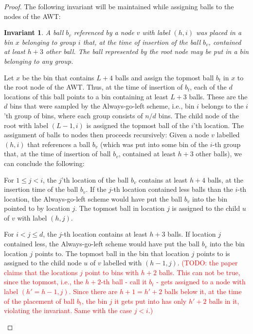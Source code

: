 \documentclass[a4paper,12pt]{article}
\newcommand\todo[1]{\textcolor{red}{(TODO: #1)}}
\newtheorem{invariant}{Invariant}
\begin{document}
\begin{proof}
The following invariant will be maintained while assigning balls to the nodes of the AWT:
\begin{invariant}
A ball $b_v$ referenced by a node $v$ with label $(h,i)$ was placed in a bin $x$ belonging to group $i$ that, at the time of insertion of the ball $b_v$, contained at least $h+3$ other ball. The ball represented by the root node may be put in a bin belonging to any group.
\end{invariant}
\noindent
Let $x$ be the bin that contains $L+4$ balls and assign the topmost ball $b_t$ in $x$ to the root node of the AWT. Thus, at the time of insertion of $b_t$, each of the $d$ locations of this ball points to a bin containing at least $L+3$ balls. These are the $d$ bins that were sampled by the Always-go-left scheme, i.e., bin $i$ belongs to the $i$'th group of bins, where each group consists of $n/d$ bins. The child node of the root with label $(L-1, i)$ is assigned the topmost ball of the $i$'th location. The assignment of balls to nodes then proceeds recursively: Given a node $v$ labelled $(h, i)$ that references a ball $b_v$ (which was put into some bin of the $i$-th group that, at the time of insertion of ball $b_v$, contained at least $h+3$ other balls), we can conclude the following:
\begin{compactitem}
\item For $1\leq j < i$, the $j$'th location of the ball $b_v$ contains at least $h+4$ balls, at the insertion time of the ball $b_v$. If the $j$-th location contained less balls than the $i$-th location, the Always-go-left scheme would have put the ball $b_v$ into the bin pointed to by location $j$. The topmost ball in location $j$ is assigned to the  child $u$ of $v$ with label $(h,j)$. 
\item For $i < j \leq d$, the $j$-th location contains at least $h+3$ balls. If location $j$ contained less, the Always-go-left scheme would have put the ball $b_v$ into the bin location $j$ points to. The topmost ball in the bin that location $j$ points to is assigned to the child node $u$ of $v$ labelled with $(h-1, j)$. \todo{the paper claims that the locations $j$ point to bins with $h+2$ balls. This can not be true, since the topmost, i.e., the $h+2$-th ball - call it $b_t$ - gets assigned to a node with label $(h'=h-1, j)$. Since there are $h+1=h'+2$ balls below it, at the time of the placement of ball $b_t$, the bin $j$ it gets put into has only $h'+2$ balls in it, violating the invariant. Same with the case $j<i$.} 
\end{compactitem}
\end{proof}
\end{document}
